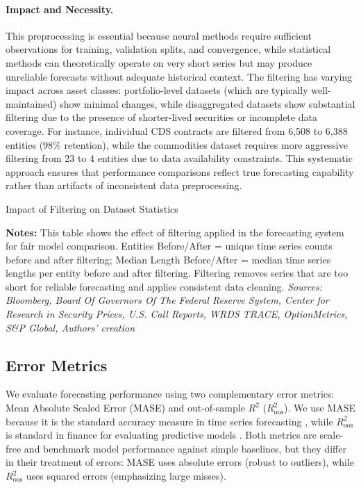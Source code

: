 \documentclass{article}
\begin{document}
\paragraph{Impact and Necessity.} This preprocessing is essential because neural methods require sufficient observations for training, validation splits, and convergence, while statistical methods can theoretically operate on very short series but may produce unreliable forecasts without adequate historical context. The filtering has varying impact across asset classes: portfolio-level datasets (which are typically well-maintained) show minimal changes, while disaggregated datasets show substantial filtering due to the presence of shorter-lived securities or incomplete data coverage. For instance, individual CDS contracts are filtered from 6,508 to 6,388 entities (98\% retention), while the commodities dataset requires more aggressive filtering from 23 to 4 entities due to data availability constraints. This systematic approach ensures that performance comparisons reflect true forecasting capability rather than artifacts of inconsistent data preprocessing.

\begin{table}[htbp]
\centering
\caption{Impact of Filtering on Dataset Statistics}
\label{tab:filtered_dataset_stats}

\vspace{0.1cm}
\begin{minipage}{\textwidth}
\scriptsize
\textbf{Notes:} This table shows the effect of filtering applied in the forecasting system for fair model comparison. 
Entities Before/After = unique time series counts before and after filtering; 
Median Length Before/After = median time series lengths per entity before and after filtering. 
Filtering removes series that are too short for reliable forecasting and applies consistent data cleaning.
\emph{Sources: Bloomberg, Board Of Governors Of The Federal Reserve System, Center for Research in Security Prices, U.S. Call Reports, WRDS TRACE, OptionMetrics, S\&P Global,  Authors' creation}
\end{minipage}
\end{table}

\subsection{Error Metrics}\label{subsec:error_metrics}
We evaluate forecasting performance using two complementary error metrics: Mean Absolute Scaled Error (MASE) and out-of-sample $R^2$ ($R^2_{\text{oos}}$). We use MASE because it is the standard accuracy measure in time series forecasting \citep{Hyndman2006}, while $R^2_{\text{oos}}$ is standard in finance for evaluating predictive models \citep{Campbell2008}. Both metrics are scale-free and benchmark model performance against simple baselines, but they differ in their treatment of errors: MASE uses absolute errors (robust to outliers), while $R^2_{\text{oos}}$ uses squared errors (emphasizing large misses).
\end{document}
